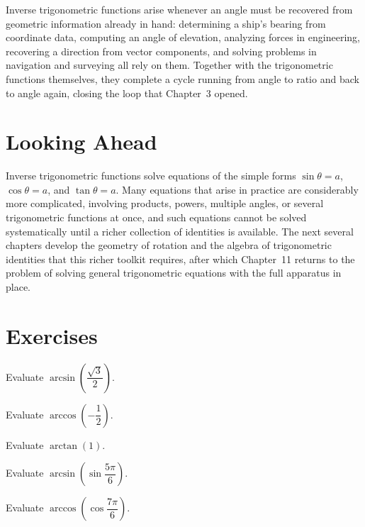 Inverse trigonometric functions arise whenever an angle must be recovered
from geometric information already in hand: determining a ship's bearing
from coordinate data, computing an angle of elevation, analyzing forces in
engineering, recovering a direction from vector components, and solving
problems in navigation and surveying all rely on them. Together with the
trigonometric functions themselves, they complete a cycle running from
angle to ratio and back to angle again, closing the loop that Chapter~3
opened.

\section{Looking Ahead}

Inverse trigonometric functions solve equations of the simple forms
$\sin\theta = a$, $\cos\theta = a$, and $\tan\theta = a$. Many equations
that arise in practice are considerably more complicated, involving
products, powers, multiple angles, or several trigonometric functions at
once, and such equations cannot be solved systematically until a richer
collection of identities is available. The next several chapters develop
the geometry of rotation and the algebra of trigonometric identities that
this richer toolkit requires, after which Chapter~11 returns to the problem
of solving general trigonometric equations with the full apparatus in
place.

\section{Exercises}
\begin{exercise}
Evaluate $\arcsin\left(\dfrac{\sqrt3}{2}\right)$.
\end{exercise}

\begin{exercise}
Evaluate $\arccos\left(-\dfrac12\right)$.
\end{exercise}

\begin{exercise}
Evaluate $\arctan(1)$.
\end{exercise}

\begin{exercise}
Evaluate $\arcsin\left(\sin\dfrac{5\pi}{6}\right)$.
\end{exercise}

\begin{exercise}
Evaluate $\arccos\left(\cos\dfrac{7\pi}{6}\right)$.
\end{exercise}

